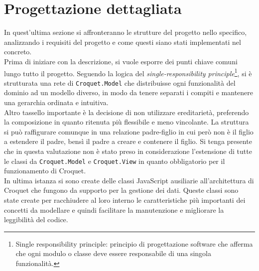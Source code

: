 \section{Progettazione dettagliata}\label{sec:progettazione}
In quest'ultima sezione si affronteranno le strutture del progetto nello specifico, analizzando i requisiti del progetto e come questi siano stati implementati nel concreto.\\
\newline
Prima di iniziare con la descrizione, si vuole esporre dei punti chiave comuni lungo tutto il progetto. Seguendo la logica del \textit{single-responsibility principle}\footnote{
    Single responsibility principle: principio di progettazione software che afferma che ogni modulo o classe deve essere responsabile di una singola funzionalità.
}, si è strutturata una rete di \texttt{Croquet.Model} che distribuisse ogni funzionalità del dominio ad un modello diverso, in modo da 
tenere separati i compiti e mantenere una gerarchia ordinata e intuitiva.\\
Altro tassello importante è la decisione di non utilizzare ereditarietà, preferendo la composizione in quanto ritenuta più flessibile e meno vincolante. La struttura si può
raffigurare comunque in una relazione padre-figlio in cui però non è il figlio a estendere il padre, bensì il padre a creare e contenere il figlio. Si tenga presente che in questa
valutazione non è stato preso in considerazione l'estensione di tutte le classi da \texttt{Croquet.Model} e \texttt{Croquet.View} in quanto obbligatorio per il funzionamento di Croquet.\\
In ultima istanza si sono create delle classi JavaScript ausiliarie all'architettura di Croquet che fungono da supporto per la gestione dei dati. Queste classi sono state create per 
racchiudere al loro interno le caratteristiche più importanti dei concetti da modellare e quindi facilitare la manutenzione e migliorare la leggibilità del codice.\\

